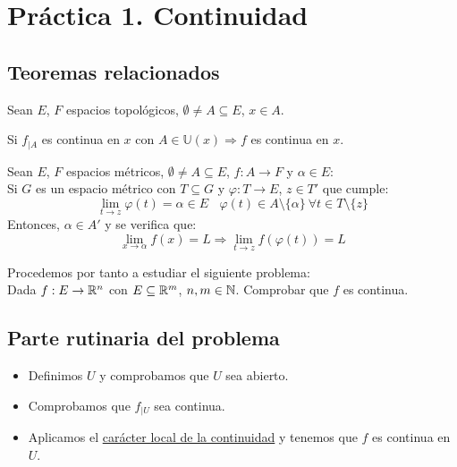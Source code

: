 \chapter{Práctica 1. Continuidad}

\section{Teoremas relacionados}
\begin{teo}
    Sean $E$, $F$ espacios topológicos, $\emptyset \neq A \subseteq E$, $x \in A$.

    
    Si $f_{\big| A}$ es continua en $x$ con $A \in \mathbb{U}(x) \Rightarrow f$ es continua en $x$.
\end{teo}

\begin{teo}
    Sean $E$, $F$ espacios métricos, $\emptyset \neq A \subseteq E$, $f:A \rightarrow F$
    y $\alpha \in E$:\\

    
    Si $G$ es un espacio métrico con $T \subseteq G$ y $\varphi:T \rightarrow E$, $z \in T'$ que cumple:
    $$\lim_{t \to z}\varphi(t)=\alpha \in E ~~~~ \varphi(t) \in A\setminus\{\alpha\} ~\forall t \in T\setminus\{z\}$$
    Entonces, $\alpha \in A'$ y se verifica que:
    $$\lim_{x \to \alpha} f(x) = L \Rightarrow \lim_{t \to z}f(\varphi(t)) = L$$
\end{teo}

\vspace{2cm}

Procedemos por tanto a estudiar el siguiente problema:\\

\noindent
Dada $f:E \rightarrow \mathbb R^n$ con $E \subseteq \mathbb R^m$, $n,m \in \mathbb N$. Comprobar que $f$ es continua.

\section{Parte rutinaria del problema}
\begin{itemize}
    \item Definimos $U$ y comprobamos que $U$ sea abierto.
    \item Comprobamos que $f_{\big|U}$ sea continua.
    \item Aplicamos el \underline{carácter local de la continuidad} y tenemos que $f$ es continua en $U$.
\end{itemize}


